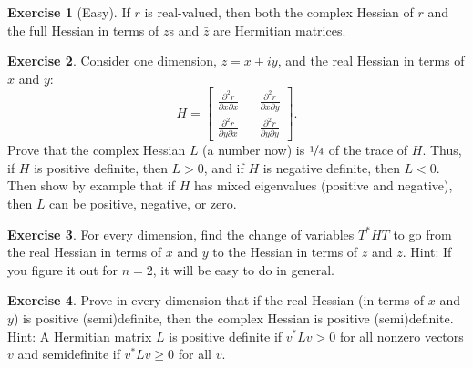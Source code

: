 \documentclass[12pt,openany]{book}
\theoremstyle{plain}
\theoremstyle{remark}
\theoremstyle{definition}
\newenvironment{exbox}{%
    \def\FrameCommand{\vrule width 1pt \relax\hspace{10pt}}%
    \MakeFramed{\advance\hsize-\width\FrameRestore}%
}{%
    \endMakeFramed
}
\theoremstyle{exercise}
\newtheorem{exercise}{Exercise}[section]
\theoremstyle{example}
\begin{document}
\begin{exbox}
\begin{exercise}[Easy]
If $r$ is real-valued, then both the complex Hessian of $r$
and the full Hessian in terms of $z$s and $\bar{z}$
are Hermitian matrices.
\end{exercise}

\begin{exercise}
\pagebreak[2]
Consider one dimension, $z = x+iy$, and the real Hessian
in terms of $x$ and $y$:
\begin{equation*}
H=\begin{bmatrix}
\frac{\partial^2 r}{\partial x\partial x} &&
\frac{\partial^2 r}{\partial x \partial y}
\\
\frac{\partial^2 r}{\partial y \partial x} &&
\frac{\partial^2 r}{\partial y\partial y}
\end{bmatrix} .
\end{equation*}
Prove that the complex Hessian $L$ (a number now) is $\nicefrac{1}{4}$
of the trace of $H$.
Thus, if $H$ is positive definite, then $L > 0$, and if $H$ is negative
definite, then $L < 0$.  Then show by example that
if $H$ has mixed eigenvalues (positive
and negative), then $L$ can be positive, negative, or zero.
\end{exercise}

\begin{exercise}
\pagebreak[2]
For every dimension,
find the change of variables $T^* H T$ to go from the real Hessian in terms
of $x$ and $y$ to the Hessian in terms of $z$ and $\bar{z}$.
Hint: If you figure it out for $n=2$, it
will be easy to do in general.
\end{exercise}

\begin{exercise}
Prove in every dimension that if the real Hessian (in terms of $x$ and $y$) is
positive (semi)definite, then the complex Hessian is positive (semi)definite.
Hint: A Hermitian matrix $L$ is positive definite if $v^*Lv > 0$ for all
nonzero vectors $v$ and semidefinite if $v^*Lv \geq 0$ for all $v$.
\end{exercise}
\end{exbox}
\end{document}
